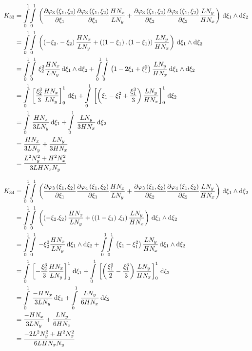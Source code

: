 \begin{equation}
  \begin{aligned}
    K_{33}&=\giint{0}{1}{0}{1}{\pbrac{\delby{\lbfn{3}{\xi_{1},\xi_{2}}}{\xi_{1}}\delby{\lbfn{3}{\xi_{1},\xi_{2}}}{\xi_{1}}
        \dfrac{H N_{x}}{L N_{y}}+\delby{\lbfn{3}{\xi_{1},\xi_{2}}}{\xi_{2}}\delby{\lbfn{3}{\xi_{1},\xi_{2}}}{\xi_{2}}
        \dfrac{L N_{y}}{H N_{x}}}}{\xi_{1}}{\xi_{2}}\\
    &=\giint{0}{1}{0}{1}{\pbrac{\pbrac{-\xi_{2}.-\xi_{2}}\dfrac{H N_{x}}{L N_{y}}+
    \pbrac{\pbrac{1-\xi_{1}}.\pbrac{1-\xi_{1}}}\dfrac{L N_{y}}{H N_{x}}}}{\xi_{1}}{\xi_{2}} \\
    &=\giint{0}{1}{0}{1}{\xi_{2}^{2}\dfrac{H N_{x}}{L N_{y}}}{\xi_{1}}{\xi_{2}}+
    \giint{0}{1}{0}{1}{\pbrac{1-2\xi_{1}+\xi_{1}^{2}}\dfrac{L N_{y}}{H N_{x}}}{\xi_{1}}{\xi_{2}} \\
    &=\gint{0}{1}{\sqbrac{\dfrac{\xi_{2}^{3}}{3}\dfrac{H N_{x}}{L N_{y}}}_{0}^{1}}{\xi_{1}}+
    \gint{0}{1}{\sqbrac{\pbrac{\xi_{1}-\xi_{1}^{2}+\dfrac{\xi_{1}^{3}}{3}}\dfrac{L N_{y}}{H N_{x}}}_{0}^{1}}{\xi_{2}} \\
    &=\gint{0}{1}{\dfrac{H N_{x}}{3 L N_{y}}}{\xi_{1}}+\gint{0}{1}{\dfrac{L N_{y}}{3 H N_{x}}}{\xi_{2}} \\
    &=\dfrac{H N_{x}}{3 L N_{y}}+\dfrac{L N_{y}}{3 H N_{x}} \\
    &=\dfrac{L^{2}N_{y}^{2}+H^{2}N_{x}^{2}}{3 L H N_{x} N_{y}}
  \end{aligned}
\end{equation}

\begin{equation}
  \begin{aligned}
    K_{34}&=\giint{0}{1}{0}{1}{\pbrac{\delby{\lbfn{3}{\xi_{1},\xi_{2}}}{\xi_{1}}\delby{\lbfn{4}{\xi_{1},\xi_{2}}}{\xi_{1}}
        \dfrac{H N_{x}}{L N_{y}}+\delby{\lbfn{3}{\xi_{1},\xi_{2}}}{\xi_{2}}\delby{\lbfn{4}{\xi_{1},\xi_{2}}}{\xi_{2}}
        \dfrac{L N_{y}}{H N_{x}}}}{\xi_{1}}{\xi_{2}}\\
    &=\giint{0}{1}{0}{1}{\pbrac{\pbrac{-\xi_{2}.\xi_{2}}\dfrac{H N_{x}}{L N_{y}}+
    \pbrac{\pbrac{1-\xi_{1}}.\xi_{1}}\dfrac{L N_{y}}{H N_{x}}}}{\xi_{1}}{\xi_{2}} \\
    &=\giint{0}{1}{0}{1}{-\xi_{2}^{2}\dfrac{H N_{x}}{L N_{y}}}{\xi_{1}}{\xi_{2}}+
    \giint{0}{1}{0}{1}{\pbrac{\xi_{1}-\xi_{1}^{2}}\dfrac{L N_{y}}{H N_{x}}}{\xi_{1}}{\xi_{2}} \\
    &=\gint{0}{1}{\sqbrac{-\dfrac{\xi_{2}^{3}}{3}\dfrac{H N_{x}}{L N_{y}}}_{0}^{1}}{\xi_{1}}+
    \gint{0}{1}{\sqbrac{\pbrac{\dfrac{\xi_{1}^{2}}{2}-\dfrac{\xi_{1}^{3}}{3}}\dfrac{L N_{y}}{H N_{x}}}_{0}^{1}}{\xi_{2}} \\
    &=\gint{0}{1}{\dfrac{-H N_{x}}{3 L N_{y}}}{\xi_{1}}+\gint{0}{1}{\dfrac{L N_{y}}{6 H N_{x}}}{\xi_{2}} \\
    &=\dfrac{-H N_{x}}{3 L N_{y}}+\dfrac{L N_{y}}{6 H N_{x}} \\
    &=\dfrac{-2 L^{2}N_{y}^{2}+H^{2}N_{x}^{2}}{6 L H N_{x} N_{y}}
  \end{aligned}
\end{equation}

